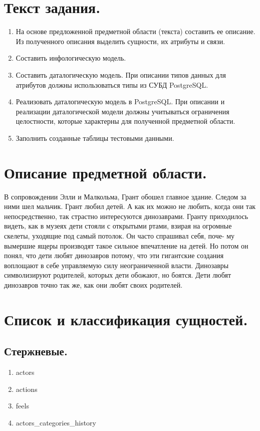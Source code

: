 
\vspace{3cm}
\tableofcontents

\newpage

\section{Текст задания.}
\begin{enumerate}
    \item На основе предложенной предметной области (текста) составить ее описание. Из полученного описания выделить сущности, их атрибуты и связи.
    \item Составить инфологическую модель.
    \item Составить даталогическую модель. При описании типов данных для атрибутов должны использоваться типы из СУБД PostgreSQL.
    \item Реализовать даталогическую модель в PostgreSQL. При описании и реализации даталогической модели должны учитываться ограничения целостности, которые характерны для полученной предметной области.
    \item Заполнить созданные таблицы тестовыми данными.
\end{enumerate}

\section{Описание предметной области.}
В сопровождении Элли и Малкольма, Грант обошел главное здание. Следом за ними шел мальчик. Грант любил детей. А как их
можно не любить, когда они так непосредственно, так страстно интересуются динозаврами. Гранту приходилось видеть, как в
музеях дети стояли с открытыми ртами, взирая на огромные скелеты, уходящие под самый потолок. Он часто спрашивал себя,
поче- му вымершие ящеры производят такое сильное впечатление на детей. Но потом он понял, что дети любят динозавров
потому, что эти гигантские создания воплощают в себе управляемую силу неограниченной власти. Динозавры символизируют
родителей, которых дети обожают, но боятся. Дети любят динозавров точно так же, как они любят своих родителей.

\section{Список и классификация сущностей.}

\subsection{Стержневые.}
\begin{enumerate}
    \item actors
    \item actions
    \item feels
    \item actors\_categories\_history
\end{enumerate}

